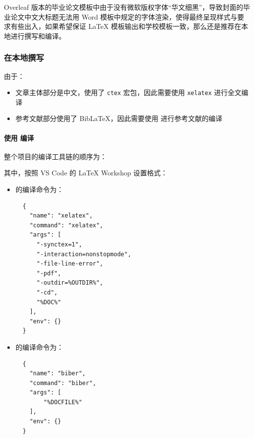Overleaf 版本的毕业论文模板中由于没有微软版权字体“华文细黑”，导致封面的毕业论文中文大标题无法用 Word 模板中规定的字体渲染，使得最终呈现样式与要求有些出入，如果希望保证 {\LaTeX} 模板输出和学校模板一致，那么还是推荐在本地进行撰写和编译。

\subsubsection{在本地撰写}

由于：

\begin{itemize}
  \item {\BIThesis} 文章主体部分是中文，使用了 \texttt{ctex} 宏包，因此需要使用 \texttt{xelatex} 进行全文编译
  \item 参考文献部分使用了 {Bib\LaTeX}，因此需要使用  进行参考文献的编译
\end{itemize}

\paragraph{使用 {} 编译}
整个项目的编译工具链的顺序为：

\begin{center}
\end{center}


其中，按照 VS Code 的 LaTeX Workshop 设置格式：

\begin{itemize}
  \item {} 的编译命令为：
  \begin{verbatim}
  {
    "name": "xelatex",
    "command": "xelatex",
    "args": [
      "-synctex=1",
      "-interaction=nonstopmode",
      "-file-line-error",
      "-pdf",
      "-outdir=%OUTDIR%",
      "-cd",
      "%DOC%"
    ],
    "env": {}
  }
  \end{verbatim}
  \item {} 的编译命令为：
  \begin{verbatim}
  {
    "name": "biber",
    "command": "biber",
    "args": [
        "%DOCFILE%"
    ],
    "env": {}
  }
  \end{verbatim}
\end{itemize}

